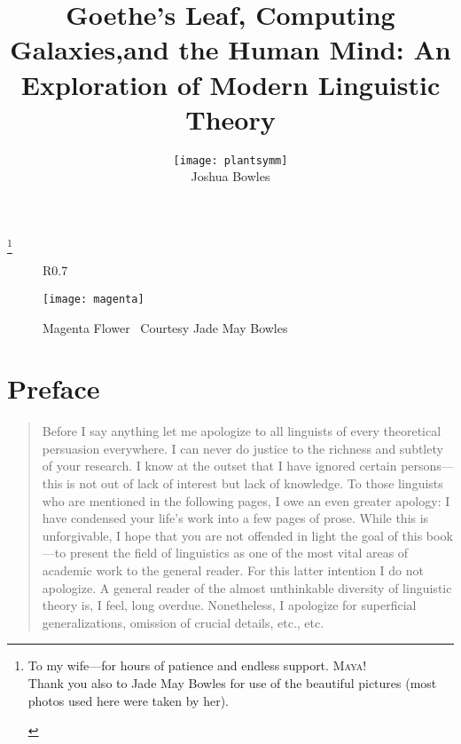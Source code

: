 \documentclass[11pt]{book}%
\theoremstyle{plain}
\numberwithin{equation}{section}
\theoremstyle{definition}
\newtheorem{phrase string}{Phrase String}
\begin{document}
\frontmatter 
\title{\Huge Goethe's Leaf, Computing Galaxies,and the Human Mind: An Exploration of Modern Linguistic Theory}
\author{\texttt{[image: plantsymm]}\\ \LARGE Joshua Bowles\\ \date{}}

\maketitle
   
\thanks{\begin{center}{To my wife---for hours of patience and endless support. \textsc{Maya!}\\
Thank you also to Jade May Bowles for use of the beautiful pictures (most photos used here were taken by her).}\end{center}}
   
   \begin{figure}[!h]
   \begin{wrapfigure}{R}{0.7\textwidth}
         \vspace{-1cm}
        \begin{center}
        \texttt{[image: magenta]}
        \caption{Magenta Flower \  \scriptsize Courtesy Jade May Bowles}
        \end{center}
         \vspace{-1cm}
    \end{wrapfigure}
    \end{figure}     
        


\tableofcontents



\chapter*{Preface}

\begin{quote}
Before I say anything let me apologize to all linguists of every theoretical persuasion everywhere. I can never do justice to the richness and subtlety of your research. I know at the outset that I have ignored certain persons---this is not out of lack of interest but lack of knowledge. To those linguists who are mentioned in the following pages, I owe an even greater apology: I have condensed your life's work into a few pages of prose. While this is unforgivable, I hope that you are not offended in light the goal of this book---to present the field of linguistics as one of the most vital areas of academic work to the general reader. For this latter intention I do not apologize. A general reader of the almost unthinkable diversity of linguistic theory is, I feel, long overdue. Nonetheless, I apologize for superficial generalizations, omission of crucial details, etc., etc. 
\end{quote}
  
\end{document}
